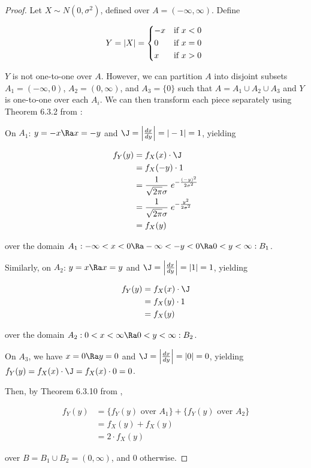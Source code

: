 \documentclass{article}
\begin{document}
\begin{proof}
  Let $X \sim N(0, \sigma^2)$, defined over $A = (-\infty, \infty)$. Define 
  
  \begin{equation*}
    Y = |X| =
    \begin{dcases*}
      -x & if $x < 0$ \\
      0 & if $x = 0$ \\
      x & if $x > 0$ \\
    \end{dcases*}
  \end{equation*}

  $Y$ is not one-to-one over $A$. However, we can partition $A$ into disjoint
  subsets $A_1 = (-\infty, 0)$, $A_2 = (0, \infty)$, and $A_3 = \{0\}$ such
  that $A = A_1 \cup A_2 \cup A_3$ and $Y$ is one-to-one over each $A_i$. We
  can then transform each piece separately using Theorem 6.3.2 from
  \citet{textbook}:

  On $A_1$: $y = -x \Ra x = -y$ and $\J = \left| \frac{dx}{dy} \right| = |-1|
  = 1$, yielding

  \begin{align*}
    f_Y(y) &= f_X(x) \cdot \J \\
    &= f_X(-y) \cdot 1 \\
    &= \frac{1}{\sqrt{2\pi}\sigma} \; e^{-\frac{(-y)^2}{2\sigma^2}} \\
    &= \frac{1}{\sqrt{2\pi}\sigma} \; e^{-\frac{y^2}{2\sigma^2}} \\
    &= f_X(y)
  \end{align*}

  over the domain $A_1: -\infty < x < 0 \Ra -\infty < -y < 0 \Ra 0 < y < \infty :B_1$.

  Similarly, on $A_2$: $y = x \Ra x = y$ and $\J = \left| \frac{dx}{dy}
  \right| = |1| = 1$, yielding

  \begin{align*}
    f_Y(y) &= f_X(x) \cdot \J \\
    &= f_X(y) \cdot 1 \\
    &= f_X(y)
  \end{align*}

  over the domain $A_2: 0 < x < \infty \Ra 0 < y < \infty :B_2$.

  On $A_3$, we have $x = 0 \Ra y = 0$ and $\J = \left| \frac{dx}{dy} \right| =
  |0| = 0$, yielding $f_Y(y) = f_X(x) \cdot \J = f_X(x) \cdot 0 = 0$.

  Then, by Theorem 6.3.10 from \citet{textbook},

  \begin{align*}
    f_Y(y) &= \{ f_Y(y) \textrm{ over } A_1 \} + \{ f_Y(y) \textrm{ over } A_2 \} \\
    &= f_X(y) + f_X(y) \\
    &= 2 \cdot f_X(y)
  \end{align*}

  over $B = B_1 \cup B_2 = (0, \infty)$, and 0 otherwise.
\end{proof}
\end{document}
